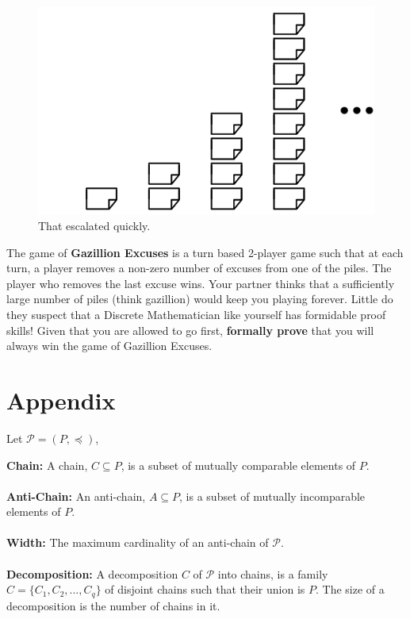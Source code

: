 \documentclass[addpoints]{exam}
\begin{document}
\begin{questions}
\begin{figure}[ht]
  \centering
  \includegraphics{excuses.png}
  \caption{That escalated quickly.}
  \label{fig:Piles of excuses}
\end{figure}

The game of \textbf{Gazillion Excuses} is a turn based 2-player game such that at each turn, a player removes a non-zero number of excuses from one of the piles. The player who removes the last excuse wins. Your partner thinks that a sufficiently large number of piles (think gazillion) would keep you playing forever. Little do they suspect that a Discrete Mathematician like yourself has formidable proof skills! Given that you are allowed to go first, \textbf{formally prove} that you will always win the game of Gazillion Excuses. 

\appendix

\section{Appendix}
Let $\mathcal{P}= (P, \preccurlyeq)$,

\textbf{Chain:} A chain, $C\subseteq P$, is a subset of mutually comparable elements of $P$.\\\\
\textbf{Anti-Chain:} An anti-chain, $A \subseteq P$, is a subset of mutually incomparable elements of $P$.\\\\
\textbf{Width:} The maximum cardinality of an anti-chain of $\mathcal{P}$.\\\\
\textbf{Decomposition:} A decomposition $C$ of $\mathcal{P}$ into chains, is a family $C = \{C_1,C_2,...,C_q\}$ of disjoint chains such that their union is $P$. The size of a decomposition is the number of chains in it.










\end{questions}
\end{document}
